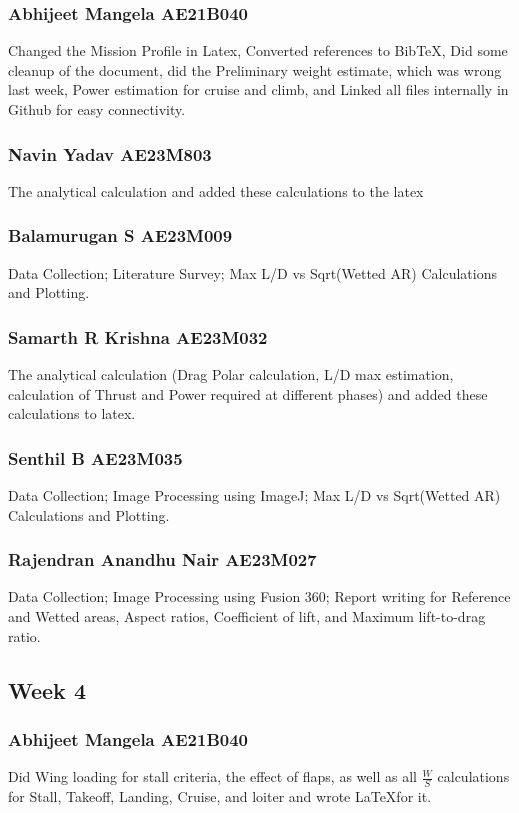 \documentclass[12 pt]{article}
\begin{document}
{\subsubsection{Abhijeet Mangela AE21B040}
Changed the Mission Profile in Latex, Converted references to BibTeX, Did some cleanup of the document, did the Preliminary weight estimate, which was wrong last week, Power estimation for cruise and climb, and Linked all files internally in Github for easy connectivity.

\subsubsection{Navin Yadav AE23M803}
The analytical calculation and added these calculations to the latex 

\subsubsection{Balamurugan S AE23M009}
Data Collection; Literature Survey; Max L/D vs Sqrt(Wetted AR) Calculations and Plotting.


\subsubsection{Samarth R Krishna AE23M032}
The analytical calculation (Drag Polar calculation, L/D max estimation, calculation of Thrust and Power required at different phases) and added these calculations to latex.


\subsubsection{Senthil B AE23M035}
Data Collection; Image Processing using ImageJ; Max L/D vs Sqrt(Wetted AR) Calculations and Plotting.


\subsubsection{Rajendran Anandhu Nair AE23M027}
Data Collection; Image Processing using Fusion 360; Report writing for Reference and Wetted areas, Aspect ratios, Coefficient of lift, and Maximum lift-to-drag ratio. 

\subsection{Week 4}


\subsubsection{Abhijeet Mangela AE21B040}
Did Wing loading for stall criteria, the effect of flaps, as well as all $\frac{W}{S}$ calculations for Stall, Takeoff, Landing, Cruise, and loiter and wrote \LaTeX for it.

}
\end{document}
